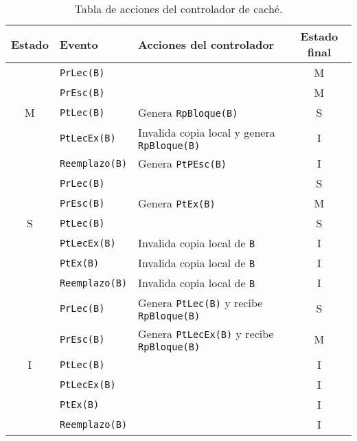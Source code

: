 \begin{table}
\centering
\begin{tabular}{c l l c}
    \toprule
    Estado & Evento & Acciones del controlador & Estado final \\
    \toprule
           & \verb|PrLec(B)| & & M \\
    \midrule
    & \verb|PrEsc(B)| & & M \\
    \midrule
    M & \verb|PtLec(B)| & Genera \verb|RpBloque(B)| & S \\
    \midrule
      & \verb|PtLecEx(B)| & Invalida copia local y genera \verb|RpBloque(B)| & I \\
    \midrule
      & \verb|Reemplazo(B)| & Genera \verb|PtPEsc(B)| & I \\
    \bottomrule
      & \verb|PrLec(B)| & & S \\
    \midrule
      & \verb|PrEsc(B)| & Genera \verb|PtEx(B)| & M \\
    \midrule
    S & \verb|PtLec(B)| & & S \\
    \midrule
      & \verb|PtLecEx(B)| & Invalida copia local de \verb|B| & I \\
    \midrule
      & \verb|PtEx(B)| & Invalida copia local de \verb|B| & I \\
    \midrule
      & \verb|Reemplazo(B)| & Invalida copia local de \verb|B| & I \\
    \toprule
      & \verb|PrLec(B)| & Genera \verb|PtLec(B)| y recibe \verb|RpBloque(B)| & S \\
    \midrule
      & \verb|PrEsc(B)| & Genera \verb|PtLecEx(B)| y recibe \verb|RpBloque(B)|& M \\
    \midrule
    I & \verb|PtLec(B)| & & I \\
    \midrule
      & \verb|PtLecEx(B)| & & I \\
    \midrule
      & \verb|PtEx(B)| & & I \\
    \midrule
      & \verb|Reemplazo(B)| & & I \\
    \bottomrule
\end{tabular}
\caption{Tabla de acciones del controlador de caché.}
\label{tab:acciones_controlador_MSI}
\end{table}

